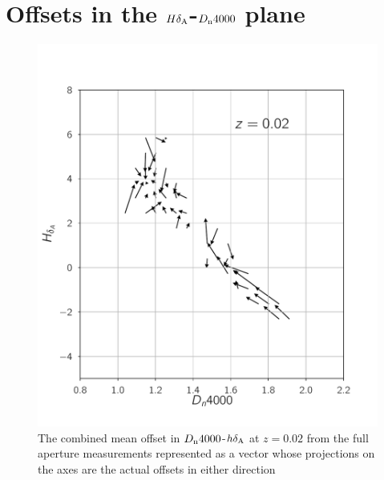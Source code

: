 \section{Offsets in the $H\delta_{\rm A}$-$D_{\rm n}4000$ plane}

\begin{figure}
\includegraphics[width=\textwidth]{figures/quiver_a.pdf}
\caption[ The combined mean offset in $D_{\rm n}4000$-$h\delta_{\rm A}$ at $z=0.02$ from the full aperture measurements represented as a vector whose projections on the axes are the actual offsets in either direction ]{ The combined mean offset in $D_{\rm n}4000$-$h\delta_{\rm A}$ at $z=0.02$ from the full aperture measurements represented as a vector whose projections on the axes are the actual offsets in either direction
\label{fig:offset_quiver1}}
\end{figure}


